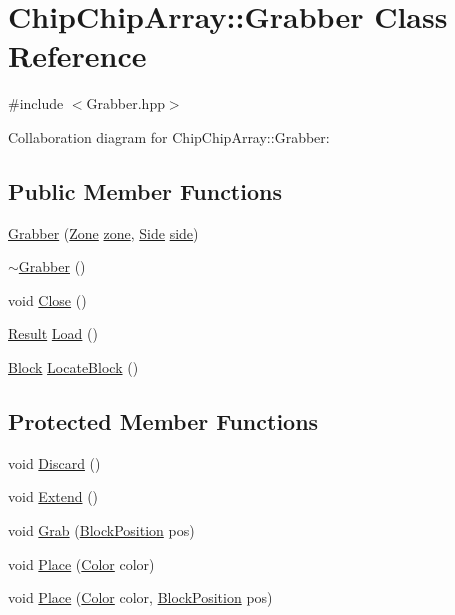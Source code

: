 \hypertarget{classChipChipArray_1_1Grabber}{\section{Chip\+Chip\+Array\+:\+:Grabber Class Reference}
\label{classChipChipArray_1_1Grabber}
}


{\ttfamily \#include $<$Grabber.\+hpp$>$}



Collaboration diagram for Chip\+Chip\+Array\+:\+:Grabber\+:
\subsection*{Public Member Functions}
\begin{DoxyCompactItemize}
\item 
\hyperlink{classChipChipArray_1_1Grabber_a7333f40c135fbe92d59651f75032b4e7}{Grabber} (\hyperlink{definitions_8hpp_adbd1e7a33d3e1751c7b2aa2562d0ecb9}{Zone} \hyperlink{classChipChipArray_1_1Grabber_ab57efe6e0b6f369b19528285a278d967}{zone}, \hyperlink{definitions_8hpp_a03325a8a9d4f105db5e37dd587128142}{Side} \hyperlink{classChipChipArray_1_1Grabber_a8afbaefae7c767c862fd1bf13968539b}{side})
\item 
\hyperlink{classChipChipArray_1_1Grabber_a0fe4bfbb6e479006a584f50cac0b5d5d}{$\sim$\+Grabber} ()
\item 
void \hyperlink{classChipChipArray_1_1Grabber_aacf089ceb4aa5b263c2cc702fb3daf74}{Close} ()
\item 
\hyperlink{definitions_8hpp_ab84ebabb02540c4a7ec341a213abf1dc}{Result} \hyperlink{classChipChipArray_1_1Grabber_a56639f8f9ba9468bce4b6d69ceb2eb54}{Load} ()
\item 
\hyperlink{classChipChipArray_1_1Block}{Block} \hyperlink{classChipChipArray_1_1Grabber_a86bc18ecf71c7ff4e324df0467af124a}{Locate\+Block} ()
\end{DoxyCompactItemize}
\subsection*{Protected Member Functions}
\begin{DoxyCompactItemize}
\item 
void \hyperlink{classChipChipArray_1_1Grabber_a09f89b79e745db18009a022e9bfacd3a}{Discard} ()
\item 
void \hyperlink{classChipChipArray_1_1Grabber_abecb4047b4f7d5a7e691b7fb581b5a39}{Extend} ()
\item 
void \hyperlink{classChipChipArray_1_1Grabber_a0a8a57e44f291581ab2862272134a592}{Grab} (\hyperlink{definitions_8hpp_ac8e1b1f4bbac5914204c97f66f97d01f}{Block\+Position} pos)
\item 
void \hyperlink{classChipChipArray_1_1Grabber_a2833eebf4e57078c0d677379babfd2d4}{Place} (\hyperlink{definitions_8hpp_abc05a0f46084a3477cf5d5c939ff1436}{Color} color)
\item 
void \hyperlink{classChipChipArray_1_1Grabber_a817de2b1ac4208fcbe983e919cede265}{Place} (\hyperlink{definitions_8hpp_abc05a0f46084a3477cf5d5c939ff1436}{Color} color, \hyperlink{definitions_8hpp_ac8e1b1f4bbac5914204c97f66f97d01f}{Block\+Position} pos)
\end{DoxyCompactItemize}
